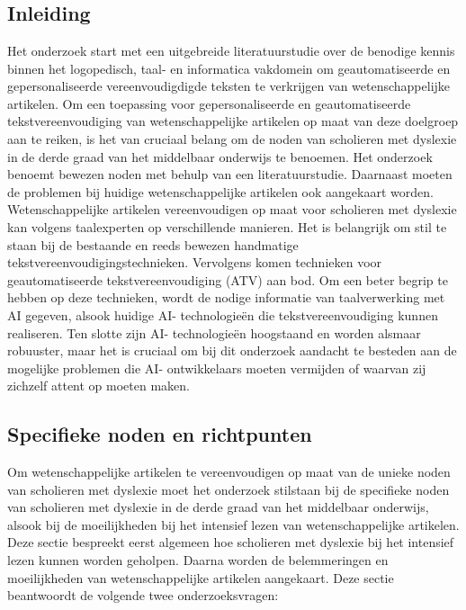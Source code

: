 \chapter{}%
\label{ch:stand-van-zaken}

\section{Inleiding}

Het onderzoek start met een uitgebreide literatuurstudie over de benodige kennis binnen het logopedisch, taal- en informatica vakdomein om geautomatiseerde en gepersonaliseerde vereenvoudigdigde teksten te verkrijgen van wetenschappelijke artikelen. Om een toepassing voor gepersonaliseerde en geautomatiseerde tekstvereenvoudiging van wetenschappelijke artikelen  op maat van deze doelgroep aan te reiken, is het van cruciaal belang om de noden van scholieren met dyslexie in de derde graad van het middelbaar onderwijs te benoemen. Het onderzoek benoemt bewezen noden met behulp van een literatuurstudie. Daarnaast moeten de problemen bij huidige wetenschappelijke artikelen ook aangekaart worden. Wetenschappelijke artikelen vereenvoudigen op maat voor scholieren met dyslexie kan volgens taalexperten op verschillende manieren. Het is belangrijk om stil te staan bij de bestaande en reeds bewezen handmatige tekstvereenvoudigingstechnieken. Vervolgens komen technieken voor geautomatiseerde tekstvereenvoudiging (ATV) aan bod. Om een beter begrip te hebben op deze technieken, wordt de nodige informatie van taalverwerking met AI gegeven, alsook huidige AI- technologieën die tekstvereenvoudiging kunnen realiseren. Ten slotte zijn AI- technologieën hoogstaand en worden alsmaar robuuster, maar het is cruciaal om bij dit onderzoek aandacht te besteden aan de mogelijke problemen die AI- ontwikkelaars moeten vermijden of waarvan zij zichzelf attent op moeten maken. 

\section{Specifieke noden en richtpunten}

Om wetenschappelijke artikelen te vereenvoudigen op maat van de unieke noden van scholieren met dyslexie moet het onderzoek stilstaan bij de specifieke noden van scholieren met dyslexie in de derde graad van het middelbaar onderwijs, alsook bij de moeilijkheden bij het intensief lezen van wetenschappelijke artikelen. Deze sectie bespreekt eerst algemeen hoe scholieren met dyslexie bij het intensief lezen kunnen worden geholpen. Daarna worden de belemmeringen en moeilijkheden van wetenschappelijke artikelen aangekaart. Deze sectie beantwoordt de volgende twee onderzoeksvragen: 

